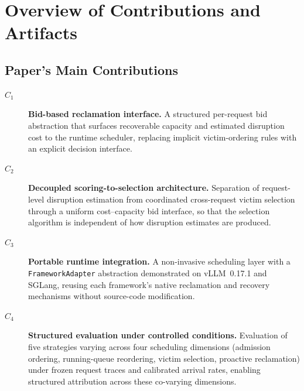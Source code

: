 \documentclass[conference]{IEEEtran}
\begin{document}


\appendixAD

\section{Overview of Contributions and Artifacts}

\subsection{Paper's Main Contributions}

\begin{description}
\item[$C_1$] \textbf{Bid-based reclamation interface.}
  A structured per-request bid abstraction that surfaces recoverable capacity
  and estimated disruption cost to the runtime scheduler, replacing implicit
  victim-ordering rules with an explicit decision interface.

\item[$C_2$] \textbf{Decoupled scoring-to-selection architecture.}
  Separation of request-level disruption estimation from coordinated
  cross-request victim selection through a uniform cost--capacity bid
  interface, so that the selection algorithm is independent of how
  disruption estimates are produced.

\item[$C_3$] \textbf{Portable runtime integration.}
  A non-invasive scheduling layer with a \texttt{FrameworkAdapter} abstraction
  demonstrated on vLLM~0.17.1 and SGLang, reusing each framework's native
  reclamation and recovery mechanisms without source-code modification.

\item[$C_4$] \textbf{Structured evaluation under controlled conditions.}
  Evaluation of five strategies varying across four scheduling dimensions
  (admission ordering, running-queue reordering, victim selection, proactive
  reclamation) under frozen request traces and calibrated arrival rates,
  enabling structured attribution across these co-varying dimensions.
\end{description}
\end{document}
